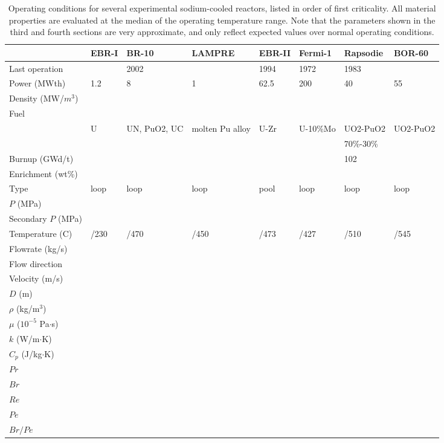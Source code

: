 \documentclass[10pt]{article}
\numberwithin{equation}{section} %
\begin{document}
\clearpage
\begin{table}
\begin{table}[H]
\caption{Operating conditions for several experimental sodium-cooled reactors, listed in order of first criticality. All material properties are evaluated at the median of the operating temperature range. Note that the parameters shown in the third and fourth sections are very approximate, and only reflect expected values over normal operating conditions. }
\centering
\begin{tabular}{l l l l l l l l}
\hline\hline
 								& EBR-I 		& BR-10 			& LAMPRE		& EBR-II		& Fermi-1			& Rapsodie		& BOR-60\\ [0.5ex]
\hline
 Last operation						& 			& 2002			& 				& 1994		& 1972			& 1983			& \\
 Power (MWth)						& 1.2			& 8				& 1				& 62.5		& 200			& 40				& 55\\
 Density (MW/\(m^3\))				& 			& 				& 				&			& 				& 				& \\
 \hdashline
 Fuel	 							& 			& 				& 				&			& \\
 								& U			& UN, PuO2, UC	& molten Pu alloy	& U-Zr		& U-10\%Mo		& UO2-PuO2		& UO2-PuO2\\
								&			&				&				&			&				& 70\%-30\%		& \\
 Burnup (GWd/t)					& 			&				&				&			&				& 102			& \\
 Enrichment (wt\%)					& 			& 				&				& 			& \\
 \hdashline
 Type							& loop		& loop			& loop			& pool		& loop			& loop			& loop\\
 \(P\) (MPa)						&			& 				&				& 			& \\
 Secondary \(P\) (MPa)				& 			&				&				& 			& \\
 Temperature (C)					& /230		& /470			& /450			& /473		& /427			& /510			& /545\\
 Flowrate (kg/s)						& 			& \\
 Flow direction						& 			& \\
 \hdashline
 Velocity (m/s)						& 			& \\
  \(D\) (m)							&			& \\
 \(\rho\) (kg/\(\textrm{m}^3\))			&			& \\
 \(\mu\) (\(10^{-5}\) Pa\(\cdot\)s)			& 			& \\
 \(k\) (W/m\(\cdot\)K)					& 			& \\
 \(C_p\) (J/kg\(\cdot\)K)				& 			& \\
 \hdashline
 \(Pr\)							& 			& \\
 \(Br\)							&			& \\
 \(Re\)							&			& \\
 \(Pe\)							&			& \\
 \(Br/Pe\)							& 			& \\
\hline
\end{tabular}
\label{table:ExperimentalSodiumReactors}
\end{table}
\end{table}
\end{document}
